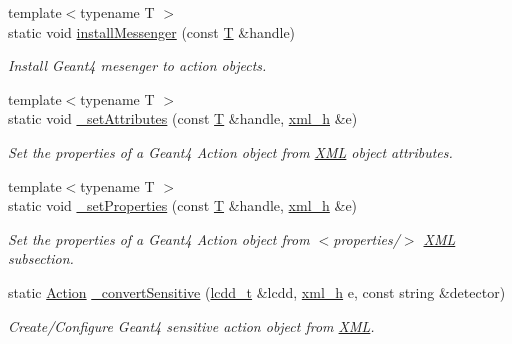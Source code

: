 \begin{DoxyCompactItemize}
{\footnotesize template$<$typename T $>$ }\\static void \hyperlink{namespace_d_d4hep_1_1_simulation_a5ab8883ec8f501df46dbeb15623d1366}{installMessenger} (const \hyperlink{class_t}{T} \&handle)
\begin{DoxyCompactList}\small\item\em Install Geant4 mesenger to action objects. \item\end{DoxyCompactList}\item 
{\footnotesize template$<$typename T $>$ }\\static void \hyperlink{namespace_d_d4hep_1_1_simulation_a4648602c0b9b77f5aae1a35a5c086e39}{\_\-setAttributes} (const \hyperlink{class_t}{T} \&handle, \hyperlink{class_d_d4hep_1_1_x_m_l_1_1_handle__t}{xml\_\-h} \&e)
\begin{DoxyCompactList}\small\item\em Set the properties of a Geant4 Action object from \hyperlink{namespace_d_d4hep_1_1_x_m_l}{XML} object attributes. \item\end{DoxyCompactList}\item 
{\footnotesize template$<$typename T $>$ }\\static void \hyperlink{namespace_d_d4hep_1_1_simulation_acd230c573ec36269957f6c861ac27b50}{\_\-setProperties} (const \hyperlink{class_t}{T} \&handle, \hyperlink{class_d_d4hep_1_1_x_m_l_1_1_handle__t}{xml\_\-h} \&e)
\begin{DoxyCompactList}\small\item\em Set the properties of a Geant4 Action object from $<$properties/$>$ \hyperlink{namespace_d_d4hep_1_1_x_m_l}{XML} subsection. \item\end{DoxyCompactList}\item 
static \hyperlink{class_d_d4hep_1_1_simulation_1_1_geant4_handle}{Action} \hyperlink{namespace_d_d4hep_1_1_simulation_ad1e0a4ddeeaccc10df73eaae26c7706b}{\_\-convertSensitive} (\hyperlink{class_d_d4hep_1_1_geometry_1_1_l_c_d_d}{lcdd\_\-t} \&lcdd, \hyperlink{class_d_d4hep_1_1_x_m_l_1_1_handle__t}{xml\_\-h} e, const string \&detector)
\begin{DoxyCompactList}\small\item\em Create/Configure Geant4 sensitive action object from \hyperlink{namespace_d_d4hep_1_1_x_m_l}{XML}. \item\end{DoxyCompactList}\item 

\end{DoxyCompactItemize}
